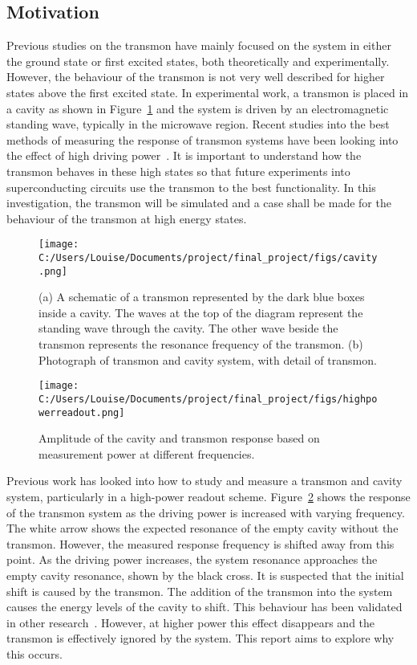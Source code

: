 \documentclass[11pt]{article}
\begin{document}
\subsection{Motivation}
Previous studies on the transmon have mainly focused on the system in either the ground state or first excited states, both theoretically and experimentally. However, the behaviour of the transmon is not very well described for higher states above the first excited state. In experimental work, a transmon is placed in a cavity as shown in Figure~\ref{fig:picture2} and the system is driven by an electromagnetic standing wave, typically in the microwave region. Recent studies into the best methods of measuring the response of transmon systems have been looking into the effect of high driving power~\cite{reedHighFidelityReadoutCircuit2010}. It is important to understand how the transmon behaves in these high states so that future experiments into superconducting circuits use the transmon to the best functionality. In this investigation, the transmon will be simulated and a case shall be made for the behaviour of the transmon at high energy states.
\begin{figure}[ht]
\centering
\texttt{[image: C:/Users/Louise/Documents/project/final\_project/figs/cavity.png]}
\caption{(a) A schematic of a transmon represented by the dark blue boxes inside a cavity. The waves at the top of the diagram represent the standing wave through the cavity. The other wave beside the transmon represents the resonance frequency of the transmon. (b) Photograph of transmon and cavity system, with detail of transmon.}
\label{fig:picture2}
\end{figure}
\begin{figure}[ht]
\centering
\texttt{[image: C:/Users/Louise/Documents/project/final\_project/figs/highpowerreadout.png]}
\caption{Amplitude of the cavity and transmon response based on measurement power at different frequencies.}
\label{fig:picture3}
\end{figure}
Previous work has looked into how to study and measure a transmon and cavity system, particularly in a high-power readout scheme. Figure~\ref{fig:picture3} shows the response of the transmon system as the driving power is increased with varying frequency. The white arrow shows the expected resonance of the empty cavity without the transmon. However, the measured response frequency is shifted away from this point. As the driving power increases, the system resonance approaches the empty cavity resonance, shown by the black cross. It is suspected that the initial shift is caused by the transmon. The addition of the transmon into the system causes the energy levels of the cavity to shift. This behaviour has been validated in other research~\cite{bishopResponseStronglyDriven2010,paikObservationHighCoherence2011,elliottApplicationsFokkerPlanckEquation2016}. However, at higher power this effect disappears and the transmon is effectively ignored by the system. This report aims to explore why this occurs.
\end{document}
